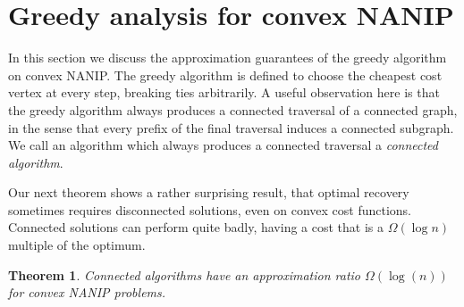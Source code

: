 \documentclass[english]{llncs}
\newtheorem{thm}{Theorem}
\begin{document}
\section{Greedy analysis for convex NANIP}

In this section we discuss the approximation guarantees of the greedy algorithm
on convex NANIP. The greedy algorithm is defined to choose the
cheapest cost vertex at every step, breaking ties arbitrarily. A useful
observation here is that the greedy algorithm always produces a connected
traversal of a connected graph, in the sense that every prefix of the final
traversal induces a connected subgraph. We call an algorithm which always produces a
connected traversal a \emph{connected algorithm}.

Our next theorem shows a rather surprising result, that optimal recovery
sometimes requires disconnected solutions, even on convex cost functions.
Connected solutions can perform quite badly, having a cost that is a
$\Omega(\log n)$ multiple of the optimum.

\begin{thm}
Connected algorithms have an approximation ratio $\Omega(\log(n))$ for convex
NANIP problems.
\end{thm}
\end{document}
